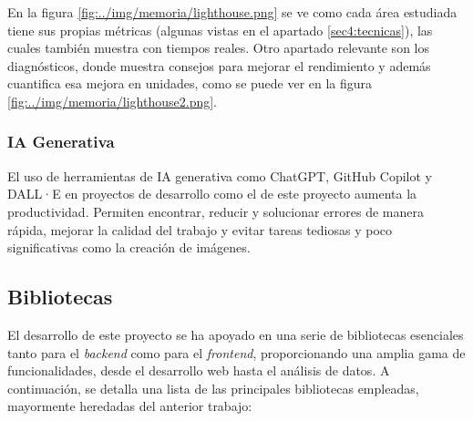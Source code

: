 
En la figura \ref{fig:../img/memoria/lighthouse.png} se ve como cada área estudiada tiene sus propias métricas (algunas vistas en el apartado \ref{sec4:tecnicas}), las cuales también muestra con tiempos reales. Otro apartado relevante son los diagnósticos, donde muestra consejos para mejorar el rendimiento y además cuantifica esa mejora en unidades, como se puede ver en la figura \ref{fig:../img/memoria/lighthouse2.png}.


\subsubsection{IA Generativa}
El uso de herramientas de IA generativa como ChatGPT, GitHub Copilot y DALL·E en proyectos de desarrollo como el de este proyecto aumenta la productividad. Permiten encontrar, reducir y solucionar errores de manera rápida, mejorar la calidad del trabajo y evitar tareas tediosas y poco significativas como la creación de imágenes.

\subsection{Bibliotecas}
El desarrollo de este proyecto se ha apoyado en una serie de bibliotecas esenciales tanto para el \textit{backend} como para el \textit{frontend}, proporcionando una amplia gama de funcionalidades, desde el desarrollo web hasta el análisis de datos. A continuación, se detalla una lista de las principales bibliotecas empleadas, mayormente heredadas del anterior trabajo:

